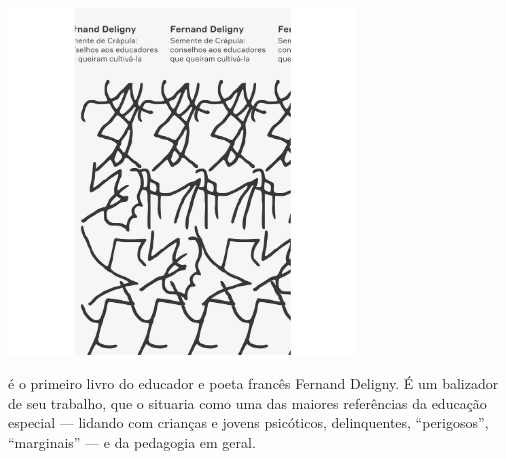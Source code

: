 \vfill

\hspace*{-.4cm}\begin{minipage}[c]{.5\linewidth}
\small{
{}}
\end{minipage}

\pagebreak

\begin{center}
\hspace*{.5cm}\includegraphics[width=92mm]{./grid/deligny.png}
\end{center}

\hspace*{-7cm}\hrulefill\hspace*{-7cm}

\medskip

 é o primeiro livro do educador e poeta francês Fernand Deligny. É um balizador de seu trabalho, que o situaria como uma das maiores referências da educação especial --- lidando com crianças e jovens psicóticos, delinquentes, “perigosos”, “marginais” --- e da pedagogia em geral.

